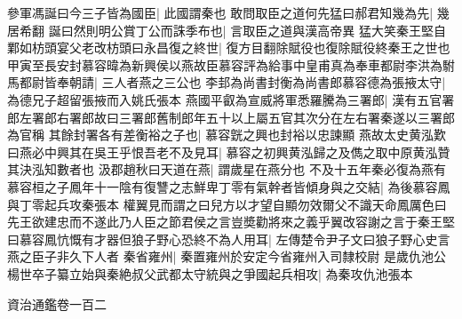 參軍馮誕曰今三子皆為國臣|{
	此國謂秦也}
敢問取臣之道何先猛曰郝君知幾為先|{
	幾居希翻}
誕曰然則明公賞丁公而誅季布也|{
	言取臣之道與漢高帝異}
猛大笑秦王堅自鄴如枋頭宴父老改枋頭曰永昌復之終世|{
	復方目翻除賦役也復除賦役終秦王之世也}
甲寅至長安封慕容暐為新興侯以燕故臣慕容評為給事中皇甫真為奉車都尉李洪為駙馬都尉皆奉朝請|{
	三人者燕之三公也}
李邽為尚書封衡為尚書郎慕容德為張掖太守|{
	為德兄子超留張掖而入姚氏張本}
燕國平叡為宣威將軍悉羅騰為三署郎|{
	漢有五官署郎左署郎右署郎故曰三署郎舊制郎年五十以上屬五官其次分在左右署秦遂以三署郎為官稱}
其餘封署各有差衡裕之子也|{
	慕容皝之興也封裕以忠諫顯}
燕故太史黄泓歎曰燕必中興其在吳王乎恨吾老不及見耳|{
	慕容之初興黄泓歸之及儁之取中原黄泓贊其決泓知數者也}
汲郡趙秋曰天道在燕|{
	謂歲星在燕分也}
不及十五年秦必復為燕有慕容桓之子鳳年十一陰有復讐之志鮮卑丁零有氣幹者皆傾身與之交結|{
	為後慕容鳳與丁零起兵攻秦張本}
權翼見而謂之曰兒方以才望自顯勿效爾父不識天命鳳厲色曰先王欲建忠而不遂此乃人臣之節君侯之言豈奬勸將來之義乎翼改容謝之言于秦王堅曰慕容鳳忼慨有才器但狼子野心恐終不為人用耳|{
	左傳楚令尹子文曰狼子野心史言燕之臣子非久下人者}
秦省雍州|{
	秦置雍州於安定今省雍州入司隸校尉}
是歲仇池公楊世卒子纂立始與秦絶叔父武都太守統與之爭國起兵相攻|{
	為秦攻仇池張本}


資治通鑑卷一百二
